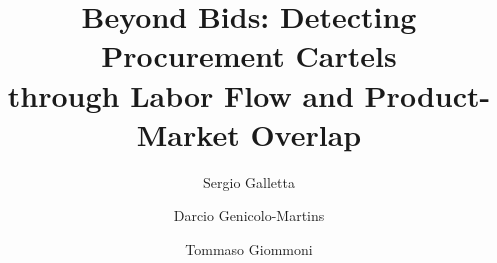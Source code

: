 \documentclass[12pt]{elsarticle}
\begin{document}
\begin{frontmatter}

\title{\textbf{Beyond Bids: Detecting Procurement Cartels\\
through Labor Flow and Product-Market Overlap}}

\author[ETH]{Sergio Galletta}
\author[INSPER]{Darcio Genicolo-Martins}
\author[UvA]{Tommaso Giommoni}
\address[ETH]{ETH Zürich}
\address[INSPER]{INSPER}
\address[UvA]{University of Amsterdam}

\begin{abstract}

\end{abstract}

\end{frontmatter}

\clearpage








\clearpage


\end{document}
